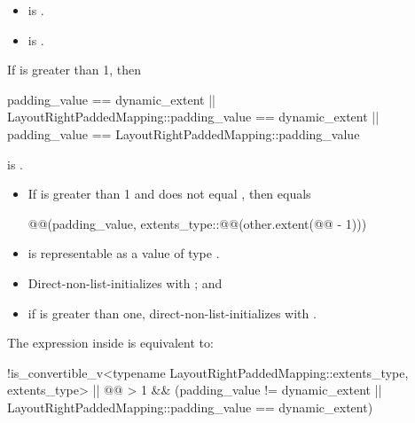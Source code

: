 \begin{itemdescr}
\pnum
\constraints
\begin{itemize}
\item
{}
is .
\item
{}
is .
\end{itemize}

\pnum
\mandates
If  is greater than 1, then
\begin{codeblock}
padding_value == dynamic_extent ||
LayoutRightPaddedMapping::padding_value == dynamic_extent ||
padding_value == LayoutRightPaddedMapping::padding_value
\end{codeblock}
is .

\pnum
\expects
\begin{itemize}
\item
If  is greater than 1 and
 does not equal ,
then  equals
\begin{codeblock}
@@(padding_value,
                        extents_type::@@(other.extent(@@ - 1)))
\end{codeblock}
\item
{} is representable as
a value of type .
\end{itemize}

\pnum
\effects
\begin{itemize}
\item
Direct-non-list-initializes  with ; and
\item
if  is greater than one,
direct-non-list-initializes 
with .
\end{itemize}

\pnum
\remarks
The expression inside  is equivalent to:
\begin{codeblock}
!is_convertible_v<typename LayoutRightPaddedMapping::extents_type, extents_type> ||
@@ > 1 &&
(padding_value != dynamic_extent ||
 LayoutRightPaddedMapping::padding_value == dynamic_extent)
\end{codeblock}
\end{itemdescr}

